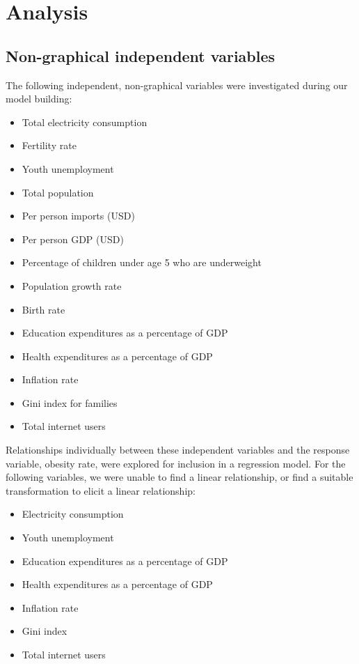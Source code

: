 \documentclass[oneside,12pt]{report}
\begin{document}
\chapter{Analysis}

\section*{Non-graphical independent variables}

The following independent, non-graphical variables were investigated during our model building:
\begin{itemize}
\item Total electricity consumption
\item Fertility rate
\item Youth unemployment
\item Total population
\item Per person imports (USD)
\item Per person GDP (USD)
\item Percentage of children under age 5 who are underweight
\item Population growth rate
\item Birth rate
\item Education expenditures as a percentage of GDP
\item Health expenditures as a percentage of GDP
\item Inflation rate
\item Gini index for families
\item Total internet users
\end{itemize}

Relationships individually between these independent variables and the response variable, obesity rate, were explored for inclusion in a regression model. For the following variables, we were unable to find a linear relationship, or find a suitable transformation to elicit a linear relationship:

\begin{itemize}
\item Electricity consumption
\item Youth unemployment
\item Education expenditures as a percentage of GDP
\item Health expenditures as a percentage of GDP
\item Inflation rate
\item Gini index
\item Total internet users
\end{itemize}
\end{document}

